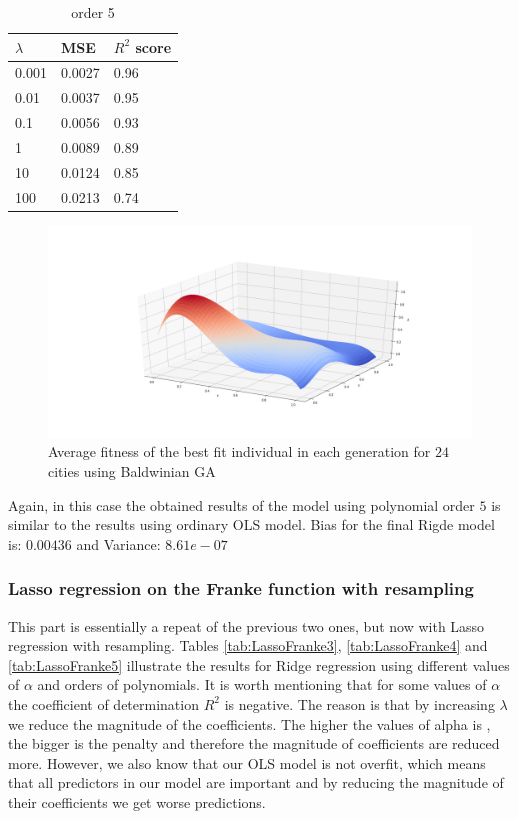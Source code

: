 \documentclass [11pt]{article}
\begin{document}
\begin{table}[H]
\centering
\begin{tabular}{lll}
\hline
$\lambda$ & MSE    & $R^{2}$ score \\ \hline
0.001     & 0.0027 & 0.96          \\
0.01      & 0.0037 & 0.95          \\
0.1       & 0.0056 & 0.93          \\
1         & 0.0089 & 0.89          \\
10        & 0.0124 & 0.85          \\
100       & 0.0213 & 0.74          \\ \hline
\end{tabular}
\caption{order 5}
\label{tab:ridge5}
\end{table}

\begin{figure}[H]
\centering
\includegraphics[width=1\textwidth]{figures/RidgeFranke.png}
        \caption{Average fitness of the best fit individual in each generation for $24$ cities using Baldwinian GA}
        \label{fig:RidgeFranke}
\end{figure}
Again, in this case the obtained results of the model using polynomial order $5$ is similar to the results using ordinary OLS model. Bias for the final Rigde model is: $0.00436$ and Variance: $8.61e-07$


\subsubsection{Lasso regression on the Franke function  with resampling}
 
This part is essentially a repeat of the previous two ones, but now with Lasso regression with resampling. Tables \ref{tab:LassoFranke3}, \ref{tab:LassoFranke4} and \ref{tab:LassoFranke5} illustrate the results for Ridge regression using different values of $\alpha$ and orders of polynomials. It is worth mentioning that for some values of $\alpha$ the coefficient of determination $R^{2}$ is negative. The reason is that by increasing $\lambda$ we reduce the magnitude of the coefficients. The higher the values of alpha is , the bigger is the penalty and therefore the magnitude of coefficients are reduced more. However, we also know that our OLS model is not overfit, which means that all predictors in our model are important and by reducing the magnitude of their coefficients we get worse predictions. 
\end{document}
